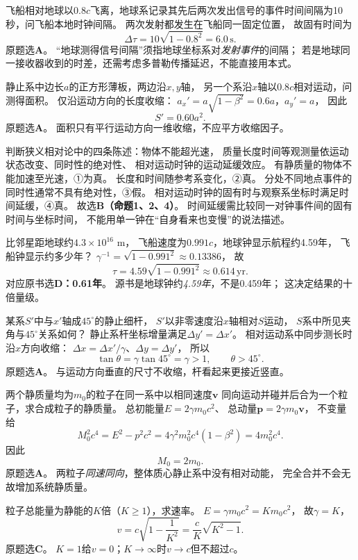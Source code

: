 \problemtext 飞船相对地球以$0.8c$飞离，地球系记录其先后两次发出信号的事件时间间隔为10秒，问飞船本地时钟间隔。
\workings
两次发射都发生在飞船同一固定位置，
故固有时间为
\[
\boxed{\Delta\tau=10\sqrt{1-0.8^2}=6.0\,\mathrm s}.
\]
原题选\textbf{A}。
\crosscheck “地球测得信号间隔”须指地球坐标系对\emph{发射事件}的间隔；
若是地球同一接收器收到的时差，还需考虑多普勒传播延迟，不能直接用本式。

\problemtext 静止系中边长$a$的正方形薄板，两边沿$x,y$轴，
另一个系沿$x$轴以$0.8c$相对运动，问测得面积。
\workings
仅沿运动方向的长度收缩：
$a_x'=a\sqrt{1-\beta^2}=0.6a$，$a_y'=a$，
因此
\[
\boxed{S'=0.60a^2}.
\]
原题选\textbf{A}。
\crosscheck 面积只有平行运动方向一维收缩，不应平方收缩因子。

\problemtext 判断狭义相对论中的四条陈述：物体不能超光速，
质量长度时间等观测量依运动状态改变、同时性的绝对性、
相对运动时钟的运动延缓效应。
\workings
有静质量的物体不能加速至光速，①为真。
长度和时间随参考系变化，②真。
分处不同地点事件的同时性通常不具有绝对性，③假。
相对运动时钟的固有时与观察系坐标时满足时间延缓，④真。
故选\textbf{B（命题1、2、4）}。
\crosscheck 时间延缓需比较同一对钟事件间的固有时间与坐标时间，
不能用单一钟在“自身看来也变慢”的说法描述。

\problemtext 比邻星距地球约$4.3\times10^{16}$ m，
飞船速度为$0.991c$，地球钟显示航程约4.59年，
飞船钟显示约多少年？
\workings
$\gamma^{-1}=\sqrt{1-0.991^2}\approx0.13386$，
故
\[
\boxed{\tau=4.59\sqrt{1-0.991^2}\approx0.614\,\mathrm{yr}}.
\]
对应原书选\textbf{D：0.61年}。
\crosscheck 源书是地球钟约\emph{4.59年}，不是0.459年；
这决定结果的十倍量级。

\problemtext 某系$S'$中与$x'$轴成$45^\circ$的静止细杆，
$S'$以非零速度沿$x$轴相对$S$运动，
$S$系中所见夹角与$45^\circ$关系如何？
\workings
静止系杆坐标增量满足$\Delta y'=\Delta x'$。
相对运动系中同步测长时沿$x$方向收缩：
$\Delta x=\Delta x'/\gamma$、$\Delta y=\Delta y'$，
所以
\[
\boxed{\tan\theta=\gamma\tan45^\circ=\gamma>1},\qquad
\boxed{\theta>45^\circ}.
\]
原题选\textbf{A}。
\crosscheck 与运动方向垂直的尺寸不收缩，杆看起来更接近竖直。

\problemtext 两个静质量均为$m_0$的粒子在同一系中以相同速度$\bm v$
同向运动并碰并后合为一个粒子，求合成粒子的静质量。
\workings
总初能量$E=2\gamma m_0c^2$、
总动量$\bm p=2\gamma m_0\bm v$，
不变量给
\[
M_0^2c^4=E^2-p^2c^2
=4\gamma^2m_0^2c^4(1-\beta^2)
=4m_0^2c^4.
\]
因此
\[
\boxed{M_0=2m_0}.
\]
原题选\textbf{A}。
\crosscheck 两粒子\emph{同速同向}，整体质心静止系中没有相对动能，
完全合并不会无故增加系统静质量。

\problemtext 粒子总能量为静能的$K$倍（$K\ge1$），求速率。
\workings
$E=\gamma m_0c^2=Km_0c^2$，
故$\gamma=K$，
\[
\boxed{v=c\sqrt{1-\frac1{K^2}}
=\frac cK\sqrt{K^2-1}}.
\]
原题选\textbf{C}。
\crosscheck $K=1$给$v=0$；$K\to\infty$时$v\to c$但不超过$c$。
